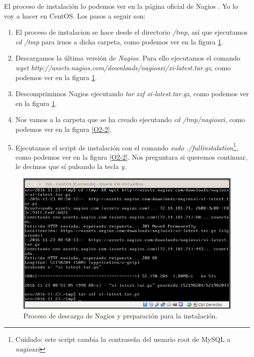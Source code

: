 \documentclass[a4paper,titlepage,12pt]{scrartcl}	%
\numberwithin{figure}{section} %
\numberwithin{table}{section} %
\begin{document}
	El proceso de instalación lo podemos ver en la página oficial de Nagios \cite{nagios}. Yo lo voy a hacer en CentOS. Los pasos a seguir son: 
	
	\begin{enumerate}
		\item El proceso de instalacion se hace desde el directorio \textit{/tmp}, así que ejecutamos \textit{cd /tmp} para irnos a dicha carpeta, como podemos ver en la figura \ref{O2-1}.
		\item Descargamos la última versión de \textit{Nagios}. Para ello ejecutamos el comando \textit{wget http://assets.nagios.com/downloads/nagiosxi/xi-latest.tar.gz}, como podemos ver en la figura \ref{O2-1}.
		\item Descomprimimos Nagios ejecutando \textit{tar xzf xi-latest.tar.gz}, como podemos ver en la figura \ref{O2-1}.
		\item Nos vamos a la carpeta que se ha creado ejecutando \textit{cd /tmp/nagiosxi}, como podemos ver en la figura \ref{O2-2}.
		\item Ejecutamos el script de instalación con el comando \textit{sudo ./fullinstalation}\footnote{Cuidado: este script cambia la contraseña del usuario root de MySQL a \textit{nagiosxi}}, como podemos ver en la figura \ref{O2-2}. Nos preguntara si queremos continuar, le decimos que sí pulsando la tecla \textit{y}.
	\end{enumerate}
	
	\begin{figure}[H]
		\includegraphics[width=\linewidth]{./Imagenes/O2-1.png}
		\vspace{-0.5cm}
		\caption[Proceso de descarga de Nagios y preparación para la instalación.]{Proceso de descarga de Nagios y preparación para la instalación.}
		\label{O2-1}
	\end{figure}
	
\end{document}
